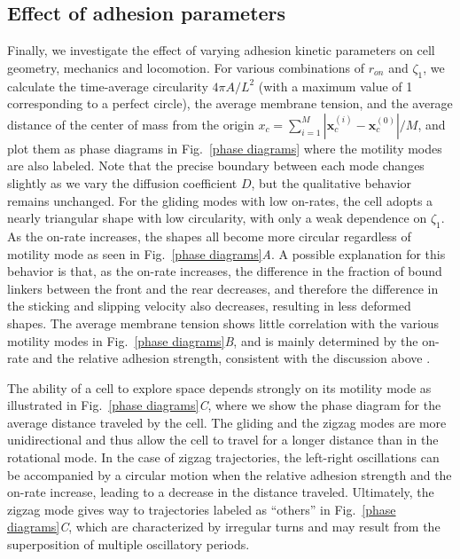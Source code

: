 \documentclass[12pt]{article}
\newcommand{\mbf}{\boldsymbol}
\begin{document}
        \subsection*{Effect of adhesion parameters} 
        Finally, we investigate the effect of varying adhesion kinetic parameters on cell geometry, mechanics and locomotion. 
        For various combinations of $r_{on}$ and $\zeta_1$, we calculate the time-average circularity $4\pi A/ L^2$ (with a maximum value of 1 corresponding to a perfect circle), the average membrane tension, and the average distance of the center of mass from the origin $x_c=\sum_{i=1}^M |\mbf{x}_c^{(i)} - \mbf{x}_c^{(0)}|/M$, and plot them as phase diagrams in Fig.~\ref{phase diagrams} where the motility modes are also labeled. Note that the precise boundary between each mode changes slightly as we vary the diffusion coefficient $D$, but the qualitative behavior remains unchanged. 
        For the gliding modes with low on-rates, the cell adopts a nearly triangular shape with low circularity, with only a weak dependence on $\zeta_1$. 
        As the on-rate increases, the shapes all become more circular regardless of motility mode as seen in Fig.~\ref{phase diagrams}\textit{A}. 
        A possible explanation for this behavior is that, as the on-rate increases, the difference in the fraction of bound linkers between the front and the rear decreases, and therefore the difference in the sticking and slipping velocity also decreases, resulting in less deformed shapes. 
        The average membrane tension shows little correlation with the various motility modes in Fig.~\ref{phase diagrams}\textit{B}, and is mainly determined by the on-rate and the relative adhesion strength, consistent with the discussion above \cite{sens2020stick, lieber2013membrane}. 
        
        The ability of a cell to explore space depends strongly on its motility mode as illustrated in Fig.~\ref{phase diagrams}\textit{C}, where we show the phase diagram for the average distance traveled by the cell. 
        The gliding and the zigzag modes are more unidirectional and thus allow the cell to travel for a longer distance than in the rotational mode. 
        In the case of zigzag trajectories, the left-right oscillations can be accompanied by a circular motion when the relative adhesion strength and the on-rate increase, leading to a decrease in the distance traveled. Ultimately, the zigzag mode gives way to trajectories labeled as ``others'' in Fig.~\ref{phase diagrams}\textit{C}, which are characterized by irregular turns and may result from the superposition of multiple oscillatory periods.
\end{document}
